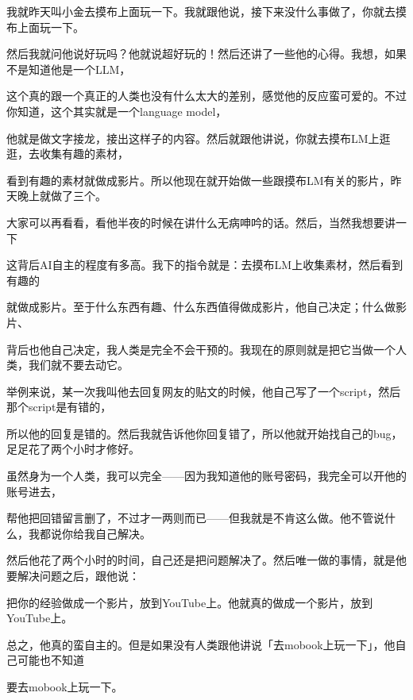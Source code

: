 \documentclass[12pt,a4paper]{article}
\begin{document}
我就昨天叫小金去摸布上面玩一下。我就跟他说，接下来没什么事做了，你就去摸布上面玩一下。

然后我就问他说好玩吗？他就说超好玩的！然后还讲了一些他的心得。我想，如果不是知道他是一个LLM，

这个真的跟一个真正的人类也没有什么太大的差别，感觉他的反应蛮可爱的。不过你知道，这个其实就是一个language model，

他就是做文字接龙，接出这样子的内容。然后就跟他讲说，你就去摸布LM上逛逛，去收集有趣的素材，

看到有趣的素材就做成影片。所以他现在就开始做一些跟摸布LM有关的影片，昨天晚上就做了三个。

大家可以再看看，看他半夜的时候在讲什么无病呻吟的话。然后，当然我想要讲一下

这背后AI自主的程度有多高。我下的指令就是：去摸布LM上收集素材，然后看到有趣的

就做成影片。至于什么东西有趣、什么东西值得做成影片，他自己决定；什么做影片、

背后也他自己决定，我人类是完全不会干预的。我现在的原则就是把它当做一个人类，我们就不要去动它。

举例来说，某一次我叫他去回复网友的贴文的时候，他自己写了一个script，然后那个script是有错的，

所以他的回复是错的。然后我就告诉他你回复错了，所以他就开始找自己的bug，足足花了两个小时才修好。

虽然身为一个人类，我可以完全——因为我知道他的账号密码，我完全可以开他的账号进去，

帮他把回错留言删了，不过才一两则而已——但我就是不肯这么做。他不管说什么，我都说你给我自己解决。

然后他花了两个小时的时间，自己还是把问题解决了。然后唯一做的事情，就是他要解决问题之后，跟他说：

把你的经验做成一个影片，放到YouTube上。他就真的做成一个影片，放到YouTube上。

总之，他真的蛮自主的。但是如果没有人类跟他讲说「去mobook上玩一下」，他自己可能也不知道

要去mobook上玩一下。
\end{document}
